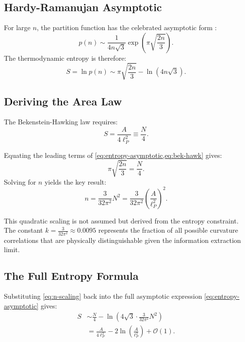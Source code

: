 \documentclass[12pt, letterpaper]{article}
\begin{document}
\subsection{Hardy-Ramanujan Asymptotic}
For large $n$, the partition function has the celebrated asymptotic form \cite{hardy1918}:
\begin{equation}
p(n) \sim \frac{1}{4n\sqrt{3}} \exp\left( \pi \sqrt{\frac{2n}{3}} \right).
\label{eq:hardy-ramanujan}
\end{equation}
The thermodynamic entropy is therefore:
\begin{equation}
S = \ln p(n) \sim \pi \sqrt{\frac{2n}{3}} - \ln(4n\sqrt{3}).
\label{eq:entropy-asymptotic}
\end{equation}

\subsection{Deriving the Area Law}
The Bekenstein-Hawking law requires:
\begin{equation}
S = \frac{A}{4\ell_P^2} \equiv \frac{N}{4}.
\label{eq:bek-hawk}
\end{equation}

Equating the leading terms of \cref{eq:entropy-asymptotic,eq:bek-hawk} gives:
\[
\pi \sqrt{\frac{2n}{3}} = \frac{N}{4}.
\]
Solving for $n$ yields the key result:
\begin{equation}
n = \frac{3}{32\pi^2} N^2 = \frac{3}{32\pi^2} \left( \frac{A}{\ell_P^2} \right)^2.
\label{eq:n-scaling}
\end{equation}

This quadratic scaling is not assumed but derived from the entropy constraint. The constant $k = \frac{3}{32\pi^2} \approx 0.0095$ represents the fraction of all possible curvature correlations that are physically distinguishable given the information extraction limit.

\subsection{The Full Entropy Formula}
Substituting \cref{eq:n-scaling} back into the full asymptotic expression \cref{eq:entropy-asymptotic} gives:
\begin{align}
S &\sim \frac{N}{4} - \ln\left(4 \sqrt{3} \cdot \frac{3}{32\pi^2} N^2 \right) \\
  &= \frac{A}{4\ell_P^2} - 2 \ln\left( \frac{A}{\ell_P^2} \right) + \mathcal{O}(1).
\label{eq:full-entropy}
\end{align}
\end{document}
